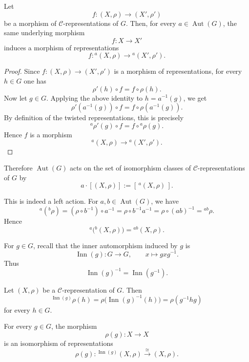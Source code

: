 \begin{lemma}
    Let
    \[
        f:(X,\rho)\longrightarrow (X',\rho')
    \]
    be a morphism of \(\mathcal{C}\)-representations of \(G\). Then, for every
    \(a\in \operatorname{Aut}(G)\), the same underlying morphism
    \[
        f:X\longrightarrow X'
    \]
    induces a morphism of representations
    \[
        f:{}^{a}(X,\rho)\longrightarrow {}^{a}(X',\rho').
    \]
\end{lemma}

\begin{proof}
    Since \(f:(X,\rho)\to (X',\rho')\) is a morphism of representations, for every
    \(h\in G\) one has
    \[
        \rho'(h)\circ f=f\circ \rho(h).
    \]
    Now let \(g\in G\). Applying the above identity to \(h=a^{-1}(g)\), we get
    \[
        \rho'(a^{-1}(g))\circ f
        =
        f\circ \rho(a^{-1}(g)).
    \]
    By definition of the twisted representations, this is precisely
    \[
        {}^{a}\rho'(g)\circ f
        =
        f\circ {}^{a}\rho(g).
    \]
    Hence \(f\) is a morphism
    \[
        {}^{a}(X,\rho)\longrightarrow {}^{a}(X',\rho').
    \]
\end{proof}

Therefore \(\operatorname{Aut}(G)\) acts on the set of isomorphism classes of
\(\mathcal{C}\)-representations of \(G\) by
\[
    a\cdot [(X,\rho)]
    :=
    [\,{}^{a}(X,\rho)\,].
\]

\begin{remark}
    This is indeed a left action. For \(a,b\in \operatorname{Aut}(G)\), we have
    \[
        {}^{a}({}^{b}\rho)
        =
        (\rho\circ b^{-1})\circ a^{-1}
        =
        \rho\circ b^{-1}a^{-1}
        =
        \rho\circ (ab)^{-1}
        =
        {}^{ab}\rho.
    \]
    Hence
    \[
        {}^{a}\bigl({}^{b}(X,\rho)\bigr)
        =
        {}^{ab}(X,\rho).
    \]
\end{remark}

For \(g\in G\), recall that the inner automorphism induced by \(g\) is
\[
    \operatorname{Inn}(g):G\longrightarrow G,
    \qquad
    x\longmapsto gxg^{-1}.
\]
Thus
\[
    \operatorname{Inn}(g)^{-1}=\operatorname{Inn}(g^{-1}).
\]

Let \((X,\rho)\) be a \(\mathcal{C}\)-representation of \(G\). Then
\[
    {}^{\operatorname{Inn}(g)}\rho(h)
    =
    \rho\bigl(\operatorname{Inn}(g)^{-1}(h)\bigr)
    =
    \rho(g^{-1}hg)
\]
for every \(h\in G\).

\begin{proposition}
    For every \(g\in G\), the morphism
    \[
        \rho(g):X\longrightarrow X
    \]
    is an isomorphism of representations
    \[
        \rho(g):
        {}^{\operatorname{Inn}(g)}(X,\rho)
        \xrightarrow{\ \cong\ }
        (X,\rho).
    \]
\end{proposition}

